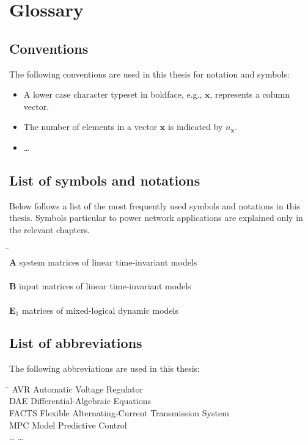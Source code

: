\chapter*{Glossary}

\graphicspath{{./0-misc/images/}}


\section*{Conventions}
The following conventions are used in this thesis for notation
and symbols:
\begin{itemize}
\item A lower case character typeset in boldface, e.g., $\mathbf{x}$,
   represents a column vector.
\item The number of elements in a vector $\mathbf{x}$ is indicated by
   $n_{\mathbf{x}}$.
\item \ldots
\end{itemize}

\section*{List of symbols and notations}
Below follows a list of the most frequently used symbols and notations
in this thesis. Symbols particular to power network applications
are explained only in the relevant chapters.

\vspace*{-0.4cm}\begin{tabbing}
\hspace*{3.5cm}\=\kill\\
$ \mathbf{A}  $ \> system matrices of linear time-invariant models \\
\\[-0.1cm]
$ \mathbf{B}  $ \> input matrices of linear time-invariant models \\
\\[-0.1cm]
$ \mathbf{E}_1 $ \> matrices of mixed-logical dynamic models \\
\end{tabbing}

\vspace*{-0.7cm}
\section*{List of abbreviations}
The following abbreviations are used in this thesis:
\begin{tabbing}
\hspace*{4cm}\=\kill
AVR \> Automatic Voltage Regulator\\
DAE \> Differential-Algebraic Equations\\
FACTS \> Flexible Alternating-Current Transmission System\\
MPC \> Model Predictive Control\\
\ldots \> \ldots
\end{tabbing}
